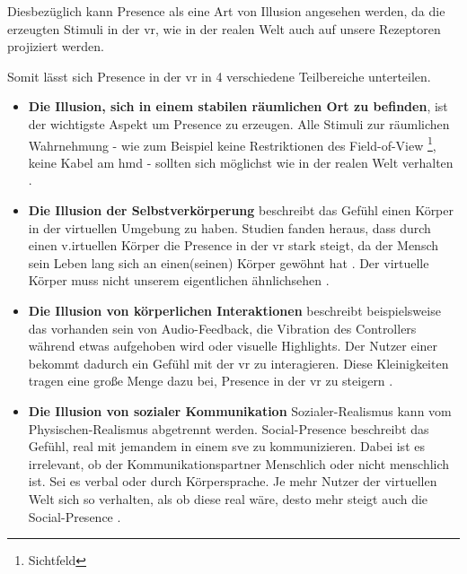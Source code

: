 \documentclass[a4paper,11pt]{article}%
\renewcommand{\\}{\vspace*{0.5\baselineskip} \newline}
\begin{document}
Diesbezüglich kann \dq{}Presence\dq{} als eine Art von Illusion angesehen werden, da die erzeugten Stimuli in der \ac{vr}, wie in der realen Welt auch auf unsere Rezeptoren projiziert werden.

Somit lässt sich \dq{}Presence\dq{} in der \ac{vr} in 4 verschiedene Teilbereiche unterteilen.

\begin{itemize}
	\item{\textbf{Die Illusion, sich in einem stabilen räumlichen Ort zu befinden}}, ist der wichtigste Aspekt um Presence zu erzeugen. Alle Stimuli zur räumlichen Wahrnehmung - wie zum Beispiel keine Restriktionen des \dq{}Field-of-View\dq{} \footnote{Sichtfeld}, keine Kabel am \ac{hmd} - sollten sich möglichst wie in der realen Welt verhalten \citep[p.47]{jerald2015vr}.
	\item{\textbf{Die Illusion der Selbstverkörperung}} beschreibt das Gefühl einen Körper in der virtuellen Umgebung zu haben. Studien fanden heraus, dass durch einen v.irtuellen Körper die \dq{}Presence\dq{} in der \ac{vr} stark steigt, da der Mensch sein Leben lang sich an einen(seinen) Körper gewöhnt hat \citep[p.756]{botvinick1998rubber}. Der virtuelle Körper muss nicht unserem eigentlichen ähnlichsehen \citep[p.7]{maxwell1960psycho}.
	\item{\textbf{Die Illusion von körperlichen Interaktionen}} beschreibt beispielsweise das vorhanden sein von Audio-Feedback, die Vibration des Controllers während etwas aufgehoben wird oder visuelle Highlights. Der Nutzer einer bekommt dadurch ein Gefühl mit der \ac{vr} zu interagieren. Diese Kleinigkeiten tragen eine große Menge dazu bei, \dq{}Presence \dq{} in der \ac{vr} zu steigern \citep[p.48]{jerald2015vr}.
	\item{\textbf{Die Illusion von sozialer Kommunikation}} Sozialer-Realismus kann vom Physischen-Realismus abgetrennt werden. \dq{}Social-Presence\dq{} beschreibt das Gefühl, real mit jemandem in einem \ac{sve} zu kommunizieren. Dabei ist es irrelevant, ob der Kommunikationspartner Menschlich oder nicht menschlich ist. Sei es verbal oder durch Körpersprache. Je mehr Nutzer der virtuellen Welt sich so verhalten, als ob diese real wäre, desto mehr steigt auch die \dq{}Social-Presence\dq{} \citep[p.49]{jerald2015vr} \citep[p.12]{guadagno2007virtual}.
\end{itemize}

\end{document}
